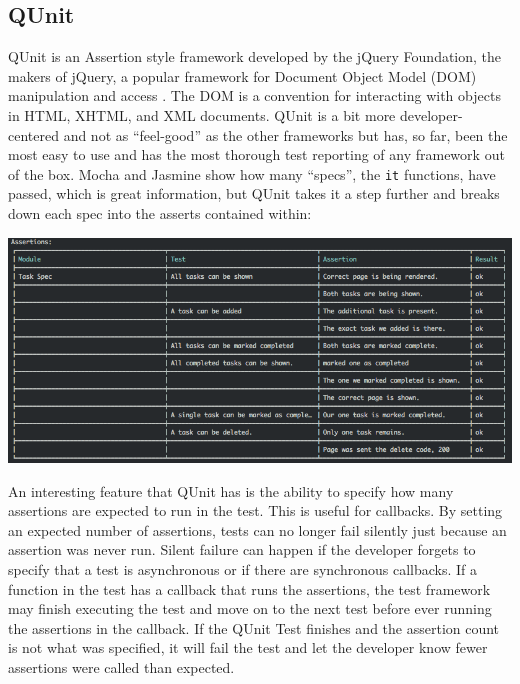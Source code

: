 \documentclass[12pt]{ucthesis}
\newenvironment{Figure}
  {\par\medskip\noindent\minipage{\linewidth}}
  {\endminipage\par\medskip}
\begin{document}
\subsection{QUnit}
QUnit \cite{QUnit} is an Assertion style framework developed by the jQuery Foundation, the makers of jQuery, a popular framework for Document Object Model (DOM) manipulation and access \cite{jQuery}. The DOM is a convention for interacting with objects in HTML, XHTML, and XML documents. QUnit is a bit more developer-centered and not as ``feel-good'' as the other frameworks but has, so far, been the most easy to use and has the most thorough test reporting of any framework out of the box. Mocha and Jasmine show how many ``specs'', the \lstinline{it} functions, have passed, which is great information, but QUnit takes it a step further and breaks down each spec into the asserts contained within:
\begin{Figure}
  \centering
  \includegraphics[width=\linewidth]{qunitrunner.png}
\end{Figure}

An interesting feature that QUnit has is the ability to specify how many assertions are expected to run in the test. This is useful for callbacks. By setting an expected number of assertions, tests can no longer fail silently just because an assertion was never run. Silent failure can happen if the developer forgets to specify that a test is asynchronous or if there are synchronous callbacks. If a function in the test has a callback that runs the assertions, the test framework may finish executing the test and move on to the next test before ever running the assertions in the callback. If the QUnit Test finishes and the assertion count is not what was specified, it will fail the test and let the developer know fewer assertions were called than expected.
\end{document}
